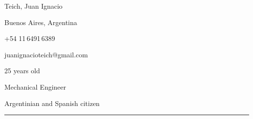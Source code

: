 \documentclass[a4paper,10pt]{article}
\newlength{\cvcolumngapwidth}
\newlength{\cvleftcolumnwidth}
\newlength{\cvrightcolumnwidth}
\newcommand{\cvnamestyle}[1]{{\Large\cvnamefont\textcolor{cvnamecolor}{#1}}}
\newcommand{\cvsectionstyle}[1]{{\normalsize\cvsectionfont\textcolor{cvsectioncolor}{#1}}}
\newlength{\cvafteritemskipamount}
\newlength{\cvaftersectionskipamount}
\newlength{\cvafternameskipamount}
\newlength{\cvafterpersonalinfolineskipamount}
\newcommand{\cvpersonalinfo}[2]{
    \begin{minipage}[t]{\cvleftcolumnwidth}
        \vspace{0mm} %
        \raggedleft #1
    \end{minipage}%
    \hspace{\cvcolumngapwidth}%
    \begin{minipage}[t]{\cvrightcolumnwidth}
        \vspace{0mm} %
        #2
    \end{minipage}

    \vspace{\cvafteritemskipamount}
}
\newcommand{\cvname}[1]{
    \cvnamestyle{#1}

    \vspace{\cvafternameskipamount}
}
\newcommand{\cvpersonalinfolinewithiconsvg}[3]{
    \raisebox{.5\fontcharht\font`E-.5\height}{}
    #3

    \vspace{\cvafterpersonalinfolineskipamount}
}
\newcommand{\cvsection}[1]{
    \begin{minipage}[t]{\cvleftcolumnwidth}
        \raggedleft\cvsectionstyle{#1}
    \end{minipage}%
    \hspace{\cvcolumngapwidth}%
    \begin{minipage}[t]{\cvrightcolumnwidth}
        \textcolor{cvrulecolor}{\rule{\cvrightcolumnwidth}{0.3mm}}
    \end{minipage}

    \vspace{\cvaftersectionskipamount}
}
\begin{document}

\cvpersonalinfo{
    \hspace{7cm}
}{
    \cvname{Teich, Juan Ignacio}

    \begin{minipage}{.5\linewidth}
        \cvpersonalinfolinewithiconsvg{height=4mm}{../logos-photos/location-dot-solid.svg}{
           Buenos Aires, Argentina
        }

        \cvpersonalinfolinewithiconsvg{height=4mm}{../logos-photos/phone-solid.svg}{
            +54 11\,6491\,6389
        }

        \cvpersonalinfolinewithiconsvg{height=3mm}{../logos-photos/envelope-solid.svg}{
            juanignacioteich@gmail.com
        }
    \end{minipage}
    \begin{minipage}{.5\linewidth}
        \cvpersonalinfolinewithiconsvg{height=4mm}{../logos-photos/calendar-days-solid.svg}{
            25 years old
        }

        \cvpersonalinfolinewithiconsvg{height=4mm}{../logos-photos/gear-solid.svg}{
            Mechanical Engineer 
        }

        \cvpersonalinfolinewithiconsvg{height=4mm}{../logos-photos/flag-solid.svg}{
            Argentinian and Spanish citizen 
        }
    \end{minipage}



}


\cvsection{PROFESSIONAL OBJECTIVES}
\end{document}
